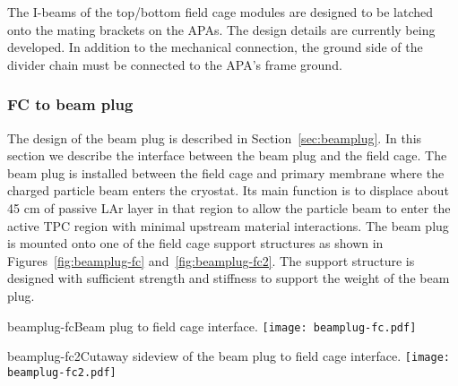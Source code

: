 The I-beams of the top/bottom field cage modules are designed to be latched onto the mating brackets on the APAs.  The design details are currently being developed.   
In addition to the mechanical connection, the ground side of the divider chain must be connected to the APA's frame ground. 


\subsubsection{FC to beam plug}
\label{subsec:fc-beamplug}
The design of the beam plug is described in Section~\ref{sec:beamplug}. In this section we describe the interface between the beam plug and the field cage. The beam plug is installed between the field cage and primary membrane where the charged particle beam enters the cryostat. Its main function is to displace about 45 cm of passive LAr layer in that region to allow the particle beam to enter the active TPC region with minimal upstream material interactions. The beam plug is mounted onto one of the field cage support structures as shown in Figures~\ref{fig:beamplug-fc} and~\ref{fig:beamplug-fc2}. The support structure is designed with sufficient  strength and stiffness to support the weight of the beam plug.
\begin{cdrfigure}{beamplug-fc}{Beam plug to field cage interface.}
\texttt{[image: beamplug-fc.pdf]}
\end{cdrfigure}
\begin{cdrfigure}{beamplug-fc2}{Cutaway sideview of the beam plug to field cage interface.}
\texttt{[image: beamplug-fc2.pdf]}
\end{cdrfigure}






